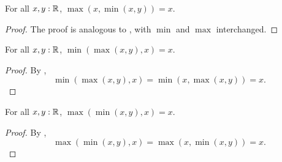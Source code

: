 \begin{lemma}
  \label{maxAbsorbLMinReal}
  For all $x, y : \mathbb{R}$, $\max(x, \min(x, y)) = x$.
\end{lemma}
\begin{proof}
  The proof is analogous to , with $\min$ and $\max$ interchanged.
\end{proof}

\begin{lemma}
  \label{minAbsorbRMaxReal}
  For all $x, y : \mathbb{R}$, $\min(\max(x, y), x) = x$.
\end{lemma}
\begin{proof}
  By ,
  \[
    \min(\max(x,y),x) = \min(x,\max(x,y)) = x.
  \]
\end{proof}

\begin{lemma}
  \label{maxAbsorbRMinReal}
  For all $x, y : \mathbb{R}$, $\max(\min(x, y), x) = x$.
\end{lemma}
\begin{proof}
  By ,
  \[
    \max(\min(x,y),x) = \max(x,\min(x,y)) = x.
  \]
\end{proof}
